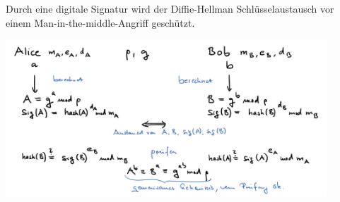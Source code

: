 \begin{frame}[fragile]

Durch eine digitale Signatur wird der Diffie-Hellman Schlüsselaustausch vor einem
Man-in-the-middle-Angriff geschützt. \pause

\includegraphics[width=12cm]{bild5.png}
\end{frame}


